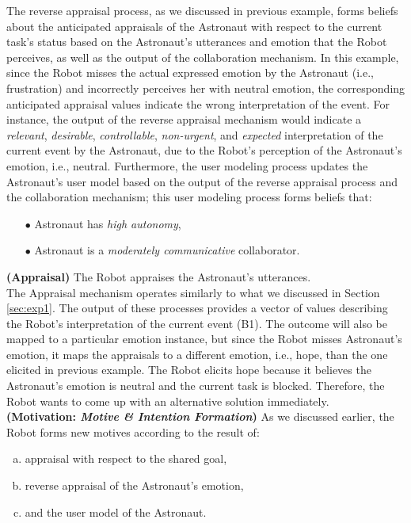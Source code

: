 The reverse appraisal process, as we discussed in previous example, forms
beliefs about the anticipated appraisals of the Astronaut with respect to the
current task's status based on the Astronaut's utterances and emotion that the
Robot perceives, as well as the output of the collaboration mechanism. In this
example, since the Robot misses the actual expressed emotion by the Astronaut
(i.e., frustration) and incorrectly perceives her with neutral emotion, the
corresponding anticipated appraisal values indicate the wrong interpretation of
the event. For instance, the output of the reverse appraisal mechanism would
indicate a \textit{relevant}, \textit{desirable}, \textit{controllable},
\textit{non-urgent}, and \textit{expected} interpretation of the current event
by the Astronaut, due to the Robot's perception of the Astronaut's emotion,
i.e., neutral. Furthermore, the user modeling process updates the Astronaut's
user model based on the output of the reverse appraisal process and the
collaboration mechanism; this user modeling process forms beliefs that:\\

\begin{itemize}
  \item[$\bullet$] Astronaut has \textit{high autonomy},
  \item[$\bullet$] Astronaut is a \textit{moderately communicative}
  collaborator.
\end{itemize}

\noindent\textbf{(Appraisal)} The Robot appraises the Astronaut's utterances.\\

The Appraisal mechanism operates similarly to what we discussed in Section
\ref{sec:exp1}. The output of these processes provides a vector of values
describing the Robot's interpretation of the current event (B1). The outcome
will also be mapped to a particular emotion instance, but since the Robot misses
Astronaut's emotion, it maps the appraisals to a different emotion, i.e.,
hope, than the one elicited in previous example. The Robot elicits hope because
it believes the Astronaut's emotion is neutral and the current task is blocked.
Therefore, the Robot wants to come up with an alternative solution
immediately.\\

\noindent\textbf{(Motivation: \textit{Motive \& Intention Formation})} As
we discussed earlier, the Robot forms new motives according to the result of:

\begin{enumerate}[a)]
  \item appraisal with respect to the shared goal,
  \item reverse appraisal of the Astronaut's emotion,
  \item and the user model of the Astronaut. 
\end{enumerate} 

